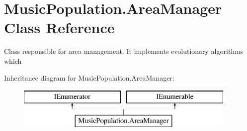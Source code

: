\hypertarget{class_music_population_1_1_area_manager}{\section{Music\+Population.\+Area\+Manager Class Reference}
\label{class_music_population_1_1_area_manager}
}


Class responsible for area management. It implements evolutionary algorithms which  


Inheritance diagram for Music\+Population.\+Area\+Manager\+:\begin{figure}[H]
\begin{center}
\leavevmode
\includegraphics[height=2.000000cm]{class_music_population_1_1_area_manager}
\end{center}
\end{figure}
